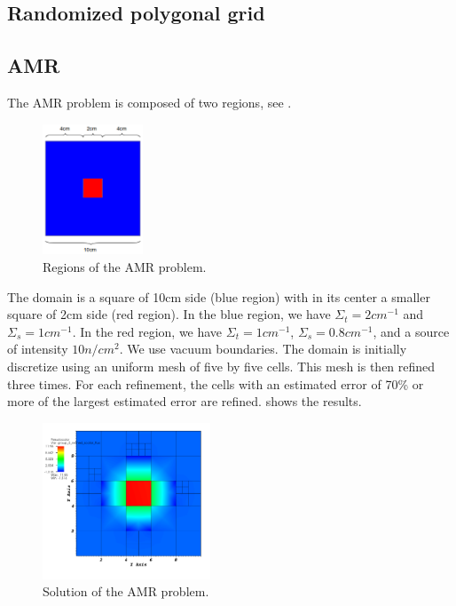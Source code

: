\subsection{Randomized polygonal grid}
\subsection{AMR}
The AMR problem is composed of two regions, see .
\begin{figure}[H]
  \centering
  \includegraphics[width=3cm]{amr_zones}
  \caption{Regions of the AMR problem.}
  \label{amr_regions}
\end{figure}
The domain is a square of 10cm side (blue region) with in its center a smaller
square of 2cm side (red region). In the blue region, we have
$\Sigma_t=2cm^{-1}$ and $\Sigma_s=1cm^{-1}$. In the red region, we have
$\Sigma_t=1cm^{-1}$, $\Sigma_s=0.8cm^{-1}$, and a source of intensity $10
n/cm^{2}$. We use vacuum boundaries. The domain is initially discretize using
an uniform mesh of five by five cells. This mesh is then refined three
times. For each refinement, the cells with an estimated error of 70\% or more
of the largest estimated error are refined.  shows the
results.
\begin{figure}[H]
  \centering
  \includegraphics[width=5cm]{diffusion_amr}
  \caption{Solution of the AMR problem.}
  \label{diffusion_amr}
\end{figure}
